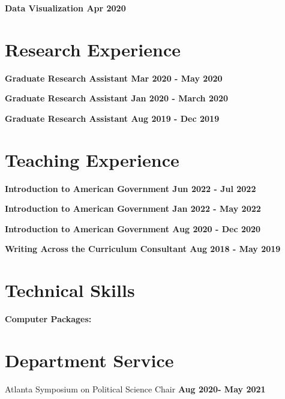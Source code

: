 \documentclass[margin]{res}
\newcommand{\fullhrulefill}{%
  \hspace*{-\sectionwidth}\hrulefill%
  }
\begin{document}
\begin{resume}
\textbf{Data Visualization \hfill{Apr 2020} \\}

\fullhrulefill
\section{ Research Experience}

\textbf {Graduate Research Assistant \hfill {Mar 2020 - May 2020} \\ }

\textbf {Graduate Research Assistant \hfill {Jan 2020 - March 2020} \\ }

\textbf {Graduate Research Assistant \hfill {Aug 2019 - Dec 2019} \\ }


\fullhrulefill
\section {Teaching Experience}

\textbf {Introduction to American Government \hfill {Jun 2022 - Jul 2022} \\ }

\textbf {Introduction to American Government \hfill {Jan 2022 - May 2022} \\ }


\textbf {Introduction to American Government \hfill {Aug 2020 - Dec 2020} \\ }

\textbf {Writing Across the Curriculum Consultant \hfill {Aug 2018 - May 2019} \\ }

\fullhrulefill
\section{Technical Skills}
\textbf{Computer Packages:} 

\fullhrulefill
\section {Department Service}
Atlanta Symposium on Political Science Chair \hfill{\textbf{Aug 2020- May 2021}}


\end{resume}
\end{document}
